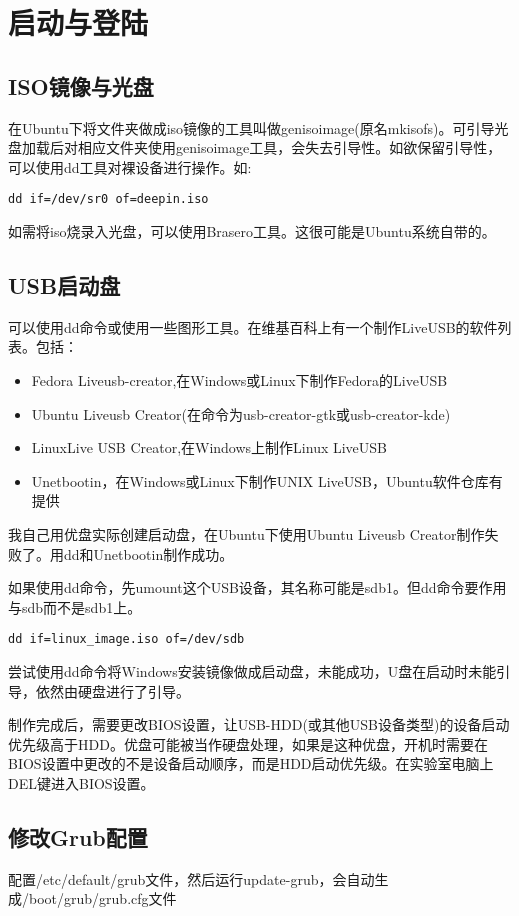\section{启动与登陆}
\subsection{ISO镜像与光盘}
在Ubuntu下将文件夹做成iso镜像的工具叫做genisoimage(原名mkisofs)。可引导光盘加载后对相应文件夹使用genisoimage工具，会失去引导性。如欲保留引导性，可以使用dd工具对裸设备进行操作。如:

\verb+dd if=/dev/sr0 of=deepin.iso+

如需将iso烧录入光盘，可以使用Brasero工具。这很可能是Ubuntu系统自带的。


\subsection{USB启动盘}

可以使用dd命令或使用一些图形工具。在维基百科上有一个制作LiveUSB的软件列表。包括：
\begin{itemize}
  \item Fedora Liveusb-creator,在Windows或Linux下制作Fedora的LiveUSB
  \item Ubuntu Liveusb Creator(在命令为usb-creator-gtk或usb-creator-kde)
  \item LinuxLive USB Creator,在Windows上制作Linux LiveUSB
  \item Unetbootin，在Windows或Linux下制作UNIX LiveUSB，Ubuntu软件仓库有提供
\end{itemize}
我自己用优盘实际创建启动盘，在Ubuntu下使用Ubuntu Liveusb Creator制作失败了。用dd和Unetbootin制作成功。

如果使用dd命令，先umount这个USB设备，其名称可能是sdb1。但dd命令要作用与sdb而不是sdb1上。
\begin{verbatim}
dd if=linux_image.iso of=/dev/sdb
\end{verbatim}
尝试使用dd命令将Windows安装镜像做成启动盘，未能成功，U盘在启动时未能引导，依然由硬盘进行了引导。

制作完成后，需要更改BIOS设置，让USB-HDD(或其他USB设备类型)的设备启动优先级高于HDD。优盘可能被当作硬盘处理，如果是这种优盘，开机时需要在BIOS设置中更改的不是设备启动顺序，而是HDD启动优先级。在实验室电脑上DEL键进入BIOS设置。


\subsection{修改Grub配置}
配置/etc/default/grub文件，然后运行update-grub，会自动生成/boot/grub/grub.cfg文件
